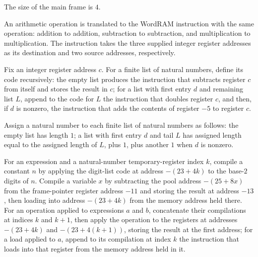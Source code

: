 \begin{definition}
\label{Light.Compiler.mainFrame}
\leanok
The size of the main frame is $4$.
\end{definition}

\begin{definition}
\label{Light.Op.instr}
\leanok
{}
An arithmetic operation is translated to the WordRAM instruction with the same
operation: addition to addition, subtraction to subtraction, and multiplication to
multiplication. The instruction takes the three supplied integer register addresses as
its destination and two source addresses, respectively.
\end{definition}

\begin{definition}
\label{Light.Compiler.digitsCode}
\leanok
{}
Fix an integer register address $c$. For a finite list of natural numbers, define its
code recursively: the empty list produces the instruction that subtracts register $c$
from itself and stores the result in $c$; for a list with first entry $d$ and remaining
list $L$, append to the code for $L$ the instruction that doubles register $c$, and
then, if $d$ is nonzero, the instruction that adds the contents of register $-5$ to
register $c$.
\end{definition}

\begin{definition}
\label{Light.Compiler.digitsLen}
\leanok
Assign a natural number to each finite list of natural numbers as follows: the empty
list has length $1$; a list with first entry $d$ and tail $L$ has assigned length equal
to the assigned length of $L$, plus $1$, plus another $1$ when $d$ is nonzero.
\end{definition}

\begin{definition}
\label{Light.Compiler.compileExpr}
\leanok
{}
For an expression and a natural-number temporary-register index $k$, compile a constant
$n$ by applying the digit-list code at address $-(23+4k)$ to the base-$2$ digits of $n$.
Compile a variable $x$ by subtracting the pool address $-(25+8x)$ from the frame-pointer
register address $-11$ and storing the result at address $-13$, then loading into
address $-(23+4k)$ from the memory address held there. For an operation applied to
expressions $a$ and $b$, concatenate their compilations at indices $k$ and $k+1$, then
apply the operation to the registers at addresses $-(23+4k)$ and $-(23+4(k+1))$, storing
the result at the first address; for a load applied to $a$, append to its compilation at
index $k$ the instruction that loads into that register from the memory address held in
it.
\end{definition}

